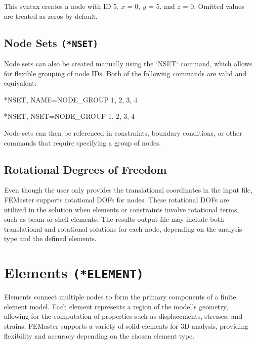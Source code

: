 This syntax creates a node with ID 5, $x$ = 0, $y$ = 5, and $z$ = 0. Omitted values are treated as zeros by default.

\subsection{Node Sets \texttt{(*NSET)}}
Node sets can also be created manually using the `NSET` command, which allows for flexible grouping of node IDs.
Both of the following commands are valid and equivalent:

\begin{codeBlock}
*NSET, NAME=NODE_GROUP
1, 2, 3, 4
\end{codeBlock}

\begin{codeBlock}
*NSET, NSET=NODE_GROUP
1, 2, 3, 4
\end{codeBlock}

Node sets can then be referenced in constraints, boundary conditions, or other commands that require specifying a group of nodes.

\subsection{Rotational Degrees of Freedom}
Even though the user only provides the translational coordinates in the input file, FEMaster supports rotational DOFs for nodes. These rotational DOFs are utilized in the solution when elements or constraints involve rotational terms, such as beam or shell elements. The results output file may include both translational and rotational solutions for each node, depending on the analysis type and the defined elements.

\newpage








\section{Elements \texttt{(*ELEMENT)}}

Elements connect multiple nodes to form the primary components of a finite element model. Each element represents a region of the model's geometry, allowing for the computation of properties such as displacements, stresses, and strains. FEMaster supports a variety of solid elements for 3D analysis, providing flexibility and accuracy depending on the chosen element type.


